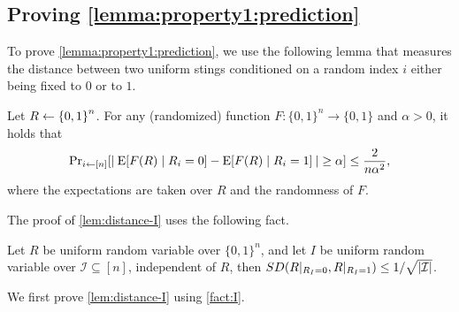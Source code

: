 \subsection{Proving \cref{lemma:property1:prediction}}\label{sec:prediction-lemma}

To prove \cref{lemma:property1:prediction}, we use the following lemma that measures the distance between two uniform stings conditioned on a random index $i$ either being fixed to $0$ or to $1$.

\def\distanceILemma{
    Let $R \la \zo^n$. For any (randomized) function $F:\{0,1\}^n\rightarrow \{0,1\}$ and $\alpha > 0$, it holds that
    \begin{align}\label{eq:f-alpha}
        \ppr{i \la [n]}{\size{\:\ex{F(R) \mid R_i = 0}-\ex{F(R) \mid R_i = 1}\:}\geq \alpha} \leq \frac{2}{n \alpha^2},
    \end{align}
    where the expectations are taken over $R$ and the randomness of $F$.
}

\begin{lemma}\label{lem:distance-I}
    \distanceILemma
\end{lemma}

The proof of \cref{lem:distance-I} uses the following fact.

\begin{fact}\label{fact:I}
	Let $R$ be uniform random variable over $\{0,1\}^n$, and let $I$ be uniform random variable over $\mathcal{I}\subseteq[n]$, independent of $R$, then $SD(R|_{R_I=0},R|_{R_I=1})\leq1/\sqrt{\size{\cI}}$.
\end{fact}

We first prove \cref{lem:distance-I} using \cref{fact:I}.

